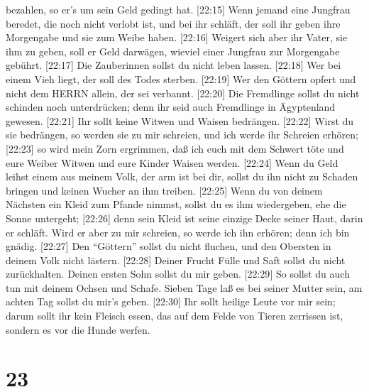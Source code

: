bezahlen, so er's um sein Geld gedingt hat.  {[}22:15{]}
Wenn jemand eine Jungfrau beredet, die noch nicht verlobt ist, und bei
ihr schläft, der soll ihr geben ihre Morgengabe und sie zum Weibe haben.
 {[}22:16{]} Weigert sich aber ihr Vater, sie ihm zu geben,
soll er Geld darwägen, wieviel einer Jungfrau zur Morgengabe gebührt.
 {[}22:17{]} Die Zauberinnen sollst du nicht leben lassen.
 {[}22:18{]} Wer bei einem Vieh liegt, der soll des Todes
sterben.  {[}22:19{]} Wer den Göttern opfert und nicht dem
HERRN allein, der sei verbannt.  {[}22:20{]} Die Fremdlinge
sollst du nicht schinden noch unterdrücken; denn ihr seid auch
Fremdlinge in Ägyptenland gewesen.  {[}22:21{]} Ihr sollt
keine Witwen und Waisen bedrängen.  {[}22:22{]} Wirst du
sie bedrängen, so werden sie zu mir schreien, und ich werde ihr Schreien
erhören;  {[}22:23{]} so wird mein Zorn ergrimmen, daß ich
euch mit dem Schwert töte und eure Weiber Witwen und eure Kinder Waisen
werden.  {[}22:24{]} Wenn du Geld leihst einem aus meinem
Volk, der arm ist bei dir, sollst du ihn nicht zu Schaden bringen und
keinen Wucher an ihm treiben.  {[}22:25{]} Wenn du von
deinem Nächsten ein Kleid zum Pfande nimmst, sollst du es ihm
wiedergeben, ehe die Sonne untergeht;  {[}22:26{]} denn
sein Kleid ist seine einzige Decke seiner Haut, darin er schläft. Wird
er aber zu mir schreien, so werde ich ihn erhören; denn ich bin gnädig.
 {[}22:27{]} Den ``Göttern'' sollst du nicht fluchen, und
den Obersten in deinem Volk nicht lästern.  {[}22:28{]}
Deiner Frucht Fülle und Saft sollst du nicht zurückhalten. Deinen ersten
Sohn sollst du mir geben.  {[}22:29{]} So sollst du auch
tun mit deinem Ochsen und Schafe. Sieben Tage laß es bei seiner Mutter
sein, am achten Tag sollst du mir's geben.  {[}22:30{]} Ihr
sollt heilige Leute vor mir sein; darum sollt ihr kein Fleisch essen,
das auf dem Felde von Tieren zerrissen ist, sondern es vor die Hunde
werfen.

\hypertarget{section-22}{%
\section{23}\label{section-22}}

